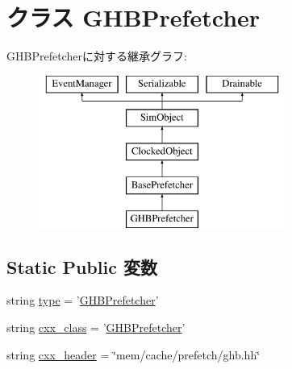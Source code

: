 \hypertarget{classPrefetcher_1_1GHBPrefetcher}{
\section{クラス GHBPrefetcher}
\label{classPrefetcher_1_1GHBPrefetcher}
}
GHBPrefetcherに対する継承グラフ:\begin{figure}[H]
\begin{center}
\leavevmode
\includegraphics[height=5cm]{classPrefetcher_1_1GHBPrefetcher}
\end{center}
\end{figure}
\subsection*{Static Public 変数}
\begin{DoxyCompactItemize}
\item 
string \hyperlink{classPrefetcher_1_1GHBPrefetcher_acce15679d830831b0bbe8ebc2a60b2ca}{type} = '\hyperlink{classPrefetcher_1_1GHBPrefetcher}{GHBPrefetcher}'
\item 
string \hyperlink{classPrefetcher_1_1GHBPrefetcher_a58cd55cd4023648e138237cfc0822ae3}{cxx\_\-class} = '\hyperlink{classPrefetcher_1_1GHBPrefetcher}{GHBPrefetcher}'
\item 
string \hyperlink{classPrefetcher_1_1GHBPrefetcher_a17da7064bc5c518791f0c891eff05fda}{cxx\_\-header} = \char`\"{}mem/cache/prefetch/ghb.hh\char`\"{}
\end{DoxyCompactItemize}


